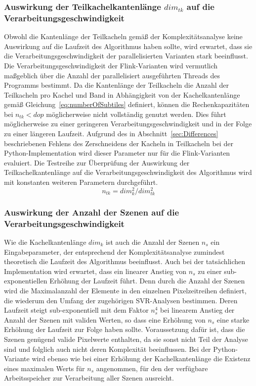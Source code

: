 \subsubsection{Auswirkung der Teilkachelkantenlänge $dim_{tk}$ auf die Verarbeitungsgeschwindigkeit}
Obwohl die Kantenlänge der Teilkacheln gemäß der Komplexitätsanalyse keine Auswirkung auf die Laufzeit des Algorithmus haben sollte, wird erwartet, dass sie die Verarbeitungsgeschwindigkeit der parallelisierten Varianten stark beeinflusst. Die Verarbeitungsgeschwindigkeit der Flink-Varianten wird vermutlich maßgeblich über die Anzahl der parallelisiert ausgeführten Threads des Programms bestimmt. Da die Kantenlänge der Teilkacheln die Anzahl der Teilkacheln pro Kachel und Band in Abhängigkeit von der Kachelkantenlänge gemäß Gleichung~\ref{eq:numberOfSubtiles} definiert, können die Rechenkapazitäten bei $n_{tk} < dop$ möglicherweise nicht vollständig genutzt werden. Dies führt möglicherweise zu einer geringeren Verarbeitungsgeschwindigkeit und in der Folge zu einer längeren Laufzeit. Aufgrund des in Abschnitt~\ref{sec:Differences} beschriebenen Fehlens des Zerschneidens der Kacheln in Teilkacheln bei der Python-Implementation wird dieser Parameter nur für die Flink-Varianten evaluiert. Die Testreihe zur Überprüfung der Auswirkung der Teilkachelkantenlänge auf die Verarbeitungsgeschwindigkeit des Algorithmus wird mit konstanten weiteren Parametern durchgeführt.
%
\begin{equation} \label{eq:numberOfSubtiles}
n_{tk} = {dim_{k}^2} / {dim_{tk}^2}
\end{equation}
%
\subsubsection{Auswirkung der Anzahl der Szenen auf die Verarbeitungsgeschwindigkeit}
Wie die Kachelkantenlänge $dim_k$ ist auch die Anzahl der Szenen $n_s$ ein Eingabeparameter, der entsprechend der Komplexitätsanalyse zumindest theoretisch die Laufzeit des Algorithmus beeinflusst. Auch bei der tatsächlichen Implementation wird erwartet, dass ein linearer Anstieg von $n_s$ zu einer sub-exponentiellen Erhöhung der Laufzeit führt. Denn durch die Anzahl der Szenen wird die Maximalanzahl der Elemente in den einzelnen Pixelzeitreihen definiert, die wiederum den Umfang der zugehörigen SVR-Analysen bestimmen. Deren Laufzeit steigt sub-exponentiell mit dem Faktor $n_s^4$ bei linearem Anstieg der Anzahl der Szenen mit validen Werten, so dass eine Erhöhung von $n_s$ eine starke Erhöhung der Laufzeit zur Folge haben sollte. Voraussetzung dafür ist, dass die Szenen genügend valide Pixelwerte enthalten, da sie sonst nicht Teil der Analyse sind und folglich auch nicht deren Komplexität beeinflussen. Bei der Python-Variante wird ebenso wie bei einer Erhöhung der Kachelkantenlänge die Existenz eines maximalen Werts für $n_s$ angenommen, für den der verfügbare Arbeitsspeicher zur Verarbeitung aller Szenen ausreicht.

